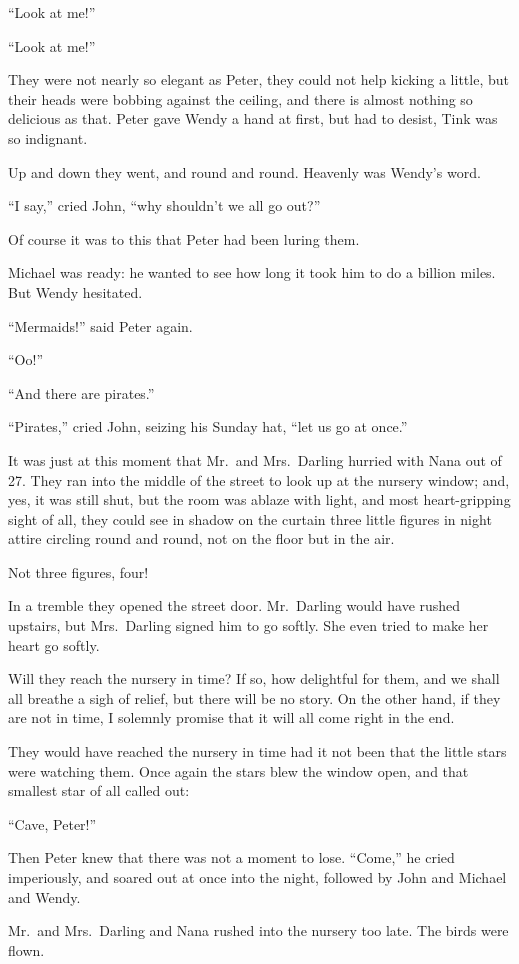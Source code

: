 ``Look at me!''

``Look at me!''

They were not nearly so elegant as Peter, they could not help kicking a little,
but their heads were bobbing against the ceiling, and there is almost nothing so
delicious as that. Peter gave Wendy a hand at first, but had to desist, Tink was
so indignant.

Up and down they went, and round and round. Heavenly was Wendy's word.

``I say,'' cried John, ``why shouldn't we all go out?''

Of course it was to this that Peter had been luring them.

Michael was ready: he wanted to see how long it took him to do a billion miles.
But Wendy hesitated.

``Mermaids!'' said Peter again.

``Oo!''

``And there are pirates.''

``Pirates,'' cried John, seizing his Sunday hat, ``let us go at once.''

It was just at this moment that Mr.\ and Mrs.\ Darling hurried with Nana out of
27. They ran into the middle of the street to look up at the nursery window;
and, yes, it was still shut, but the room was ablaze with light, and most
heart-gripping sight of all, they could see in shadow on the curtain three
little figures in night attire circling round and round, not on the floor but in
the air.

Not three figures, four!

In a tremble they opened the street door. Mr.\ Darling would have rushed
upstairs, but Mrs.\ Darling signed him to go softly. She even tried to make her
heart go softly.

Will they reach the nursery in time? If so, how delightful for them, and we
shall all breathe a sigh of relief, but there will be no story. On the other
hand, if they are not in time, I solemnly promise that it will all come right in
the end.

They would have reached the nursery in time had it not been that the little
stars were watching them. Once again the stars blew the window open, and that
smallest star of all called out:

``Cave, Peter!''

Then Peter knew that there was not a moment to lose. ``Come,'' he cried
imperiously, and soared out at once into the night, followed by John and Michael
and Wendy.

Mr.\ and Mrs.\ Darling and Nana rushed into the nursery too late. The birds were
flown.
